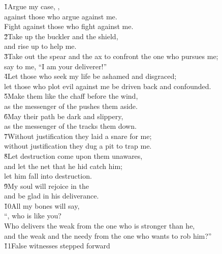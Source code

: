 \begin{poetry}
\poeml \v{1}Argue my case, , \\
\poemll    against those who argue against me. \\
\poemlll       Fight against those who fight against me. \\
\poeml \v{2}Take up the buckler and the shield, \\
\poemll    and rise up to help me. \\
\poeml \v{3}Take out the spear and the ax to confront the one who pursues me; \\
\poemll    say to me, ``I am your deliverer!'' \\
\poeml \v{4}Let those who seek my life be ashamed and disgraced; \\
\poemll    let those who plot evil against me be driven back and confounded. \\
\poeml \v{5}Make them like the chaff before the wind, \\
\poemll    as the messenger of the  pushes them aside. \\
\poeml \v{6}May their path be dark and slippery, \\
\poemll    as the messenger of the  tracks them down. \\
\poeml \v{7}Without justification they laid a snare for me; \\
\poemll    without justification they dug a pit to trap me. \\
\poeml \v{8}Let destruction come upon them unawares, \\
\poemll    and let the net that he hid catch him; \\
\poemlll       let him fall into destruction. \\
\poeml \v{9}My soul will rejoice in the  \\
\poemll    and be glad in his deliverance. \\
\poeml \v{10}All my bones will say, \\
\poemll    ``, who is like you? \\
\poeml Who delivers the weak from the one who is stronger than he, \\
\poemll    and the weak and the needy from the one who wants to rob him?'' \\
\poeml \v{11}False witnesses stepped forward \\

\end{poetry}
